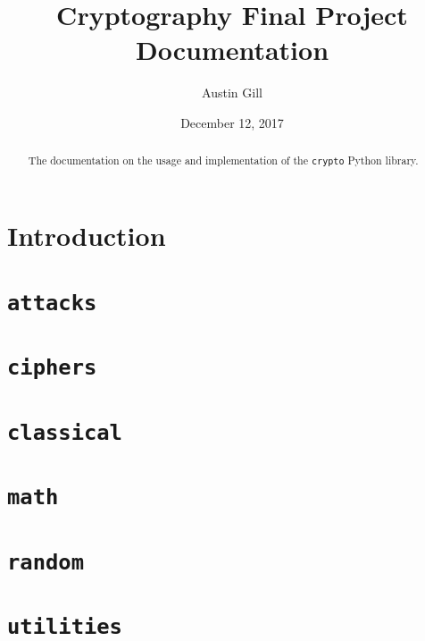 \documentclass{article}
\author{Austin Gill}
\title{Cryptography Final Project Documentation}
\date{December 12, 2017}
\begin{document}
\maketitle

\begin{abstract}
    The documentation on the usage and implementation of the \texttt{crypto} Python library.
\end{abstract}

\tableofcontents

\section{Introduction}
    

\section{\texttt{attacks}}
    

\section{\texttt{ciphers}}
    

\section{\texttt{classical}}
    

\section{\texttt{math}}
    

\section{\texttt{random}}
    

\section{\texttt{utilities}}
    
\end{document}
